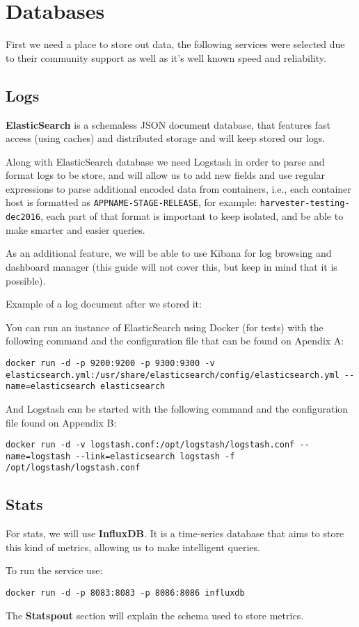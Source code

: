 \chapter{Databases}

First we need a place to store out data, 
the following services were selected due to their community support as well as it's well known speed and reliability.

\section{Logs}

\textbf{ElasticSearch} \citep{elasticsearch} is a schemaless JSON document database, that features fast access (using caches) and distributed storage and will keep stored our logs.

Along with ElasticSearch database we need Logstash 
in order to parse and format logs to be store,
and will allow us to add new fields and use regular expressions to parse additional encoded data from containers, i.e., each container host is formatted as \texttt{APPNAME-STAGE-RELEASE}, for example: \texttt{harvester-testing-dec2016}, each part of that format is important to keep isolated, and be able to make smarter and easier queries.

As an additional feature, we will be able to use Kibana for log browsing and dashboard manager (this guide will not cover this, but keep in mind that it is possible).

Example of a log document after we stored it:


You can run an instance of ElasticSearch using Docker (for tests) with the following command and the configuration file that can be found on Apendix A:

\begin{lstlisting}
docker run -d -p 9200:9200 -p 9300:9300 -v elasticsearch.yml:/usr/share/elasticsearch/config/elasticsearch.yml --name=elasticsearch elasticsearch
\end{lstlisting}

And Logstash can be started with the following command and the configuration file found on Appendix B:
\begin{lstlisting}
docker run -d -v logstash.conf:/opt/logstash/logstash.conf --name=logstash --link=elasticsearch logstash -f /opt/logstash/logstash.conf
\end{lstlisting}

\section{Stats}

For stats, we will use \textbf{InfluxDB}. It is a time-series database that aims to store this kind of metrics, allowing us to make intelligent queries.

To run the service use:

\begin{lstlisting}
docker run -d -p 8083:8083 -p 8086:8086 influxdb
\end{lstlisting}

The \textbf{Statspout} section will explain the schema used to store metrics.
